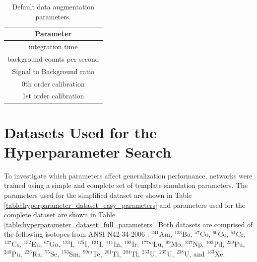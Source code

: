 \begin{table}[H]
\centering
\caption{Default data augmentation parameters.}
\begin{tabular}{c}
Parameter \\ \hline
integration time \\ 
background counts per second \\ 
Signal to Background ratio \\ 
0th order calibration \\ 
1st order calibration \\ 
\end{tabular}
\label{table:all_variable_simulation_parameters}
\end{table}



\section{Datasets Used for the Hyperparameter Search}

To investigate which parameters affect generalization performance, networks were trained using a simple and complete set of template simulation parameters. The parameters used for the simplified dataset are shown in Table \ref{table:hyperparameter_dataset_easy_parameters} and parameters used for the complete dataset are shown in Table \ref{table:hyperparameter_dataset_full_parameters}. Both datasets are comprised of the following isotopes from ANSI N42-34-2006 \cite{ANSI}: $^{241}$Am, $^{133}$Ba, $^{57}$Co, $^{60}$Co, $^{51}$Cr, $^{137}$Cs, $^{152}$Eu, $^{67}$Ga, $^{123}$I, $^{125}$I, $^{131}$I, $^{111}$In, $^{192}$Ir, $^{177m}$Lu, $^{99}$Mo, $^{237}$Np, $^{103}$Pd, $^{239}$Pu, $^{240}$Pu, $^{226}$Ra, $^{75}$Se, $^{153}$Sm, $^{99m}$Tc, $^{201}$Tl, $^{204}$Tl, $^{233}$U, $^{235}$U, $^{238}$U, and $^{133}$Xe.

